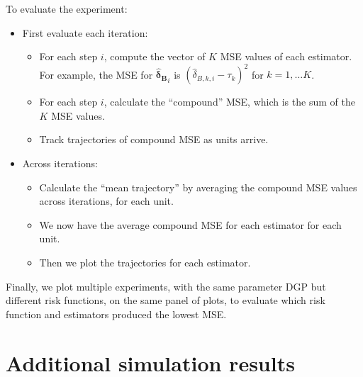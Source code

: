 \documentclass{article}
\newcommand{\bsdeltb}{\boldsymbol {\hat \delta_B}}
\begin{document}
To evaluate the experiment:
\begin{itemize}
    \item First evaluate each iteration:
    \begin{itemize}
        \item For each step $i$, compute the vector of $K$ MSE values of each estimator. For example, the MSE for $\bsdeltb_i$ is $(\hat{\delta}_{B, k, i}- \tau_k)^2$ for $k = 1, \dots K$.
        \item For each step $i$, calculate the ``compound'' MSE, which is the sum of the $K$ MSE values.
        \item Track trajectories of compound MSE as units arrive.
    \end{itemize}
    \item Across iterations:
    \begin{itemize}
        \item Calculate the ``mean trajectory'' by averaging the compound MSE values across iterations, for each unit.
        \item We now have the average compound MSE for each estimator for each unit.
        \item Then we plot the trajectories for each estimator.
    \end{itemize}
\end{itemize}

Finally, we plot multiple experiments, with the same parameter DGP but different risk functions, on the same panel of plots, to evaluate which risk function and estimators produced the lowest MSE.

\section{Additional simulation results\label{sec:sim_add_results}}
\end{document}
